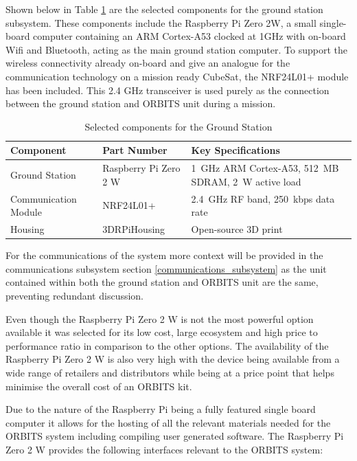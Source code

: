 \documentclass[a4paper,12pt,titlepage]{report}
\begin{document}
Shown below in Table \ref{tab:ground_station_selected_components} are the selected components for the ground station subsystem. These components include the Raspberry Pi Zero 2W, a small single-board computer containing an ARM Cortex-A53 clocked at 1GHz with on-board Wifi and Bluetooth, acting as the main ground station computer. To support the wireless connectivity already on-board and give an analogue for the communication technology on a mission ready CubeSat, the NRF24L01+ module has been included. This 2.4 GHz transceiver is used purely as the connection between the ground station and ORBITS unit during a mission. 
\begin{table}[h]
    \centering
    \caption{Selected components for the Ground Station}
    \label{tab:ground_station_selected_components}
    \begin{tabular}{|p{4cm}|p{4cm}|p{6cm}|}
    \hline
    \textbf{Component} & \textbf{Part Number} & \textbf{Key Specifications} \\ \hline
    Ground Station & Raspberry Pi Zero 2 W & 1~GHz ARM Cortex-A53, 512~MB SDRAM, 2~W active load \\ \hline
    Communication Module & NRF24L01+ & 2.4~GHz RF band, 250~kbps data rate \\ \hline
    Housing & 3DRPiHousing & Open-source 3D print~\cite{GroundStationCase} \\ \hline
    \end{tabular}
\end{table}

For the communications of the system more context will be provided in the communications subsystem section \ref{communications_subsystem} as the unit contained within both the ground station and ORBITS unit are the same, preventing redundant discussion.

Even though the Raspberry Pi Zero 2 W is not the most powerful option available it was selected for its low cost, large ecosystem and high price to performance ratio in comparison to the other options. The availability of the Raspberry Pi Zero 2 W is also very high with the device being available from a wide range of retailers and distributors while being at a price point that helps minimise the overall cost of an ORBITS kit.

Due to the nature of the Raspberry Pi being a fully featured single board computer it allows for the hosting of all the relevant materials needed for the ORBITS system including compiling user generated software. The Raspberry Pi Zero 2 W provides the following interfaces relevant to the ORBITS system:
\end{document}
